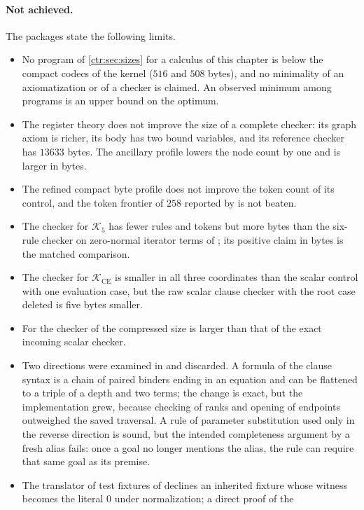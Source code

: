 \paragraph{Not achieved.}
The packages state the following limits.
\begin{itemize}
\item No program of \cref{ctr:sec:sizes} for a calculus of this chapter is below the compact
codecs of the kernel ($516$ and $508$ bytes), and no minimality of an axiomatization or of
a checker is claimed. An observed minimum among programs is an upper bound on the optimum.
\item The register theory does not improve the size of a complete checker: its graph axiom
is richer, its body has two bound variables, and its reference checker has $13633$ bytes.
The ancillary profile lowers the node count by one and is larger in bytes.
\item The refined compact byte profile does not improve the token count of its control, and
the token frontier of $258$ reported by  is not beaten.
\item The checker for $\mathcal K_5$ has fewer rules and tokens but more bytes than the
six-rule checker on zero-normal iterator terms of ; its positive claim in
bytes is the matched comparison.
\item The checker for $\mathcal K_{\mathrm{CE}}$ is smaller in all three coordinates than
the scalar control with one evaluation case, but the raw scalar clause checker with the
root case deleted is five bytes smaller.
\item For the checker of  the compressed size is larger than that of
the exact incoming scalar checker.
\item Two directions were examined in  and discarded. A formula of the
clause syntax is a chain of paired binders ending in an equation and can be flattened to a
triple of a depth and two terms; the change is exact, but the implementation grew, because
checking of ranks and opening of endpoints outweighed the saved traversal. A rule of
parameter substitution used only in the reverse direction is sound, but the intended
completeness argument by a fresh alias fails: once a goal no longer mentions the alias, the
rule can require that same goal as its premise.
\item The translator of test fixtures of  declines an inherited
fixture whose witness becomes the literal $0$ under normalization; a direct proof of the

\end{itemize}
